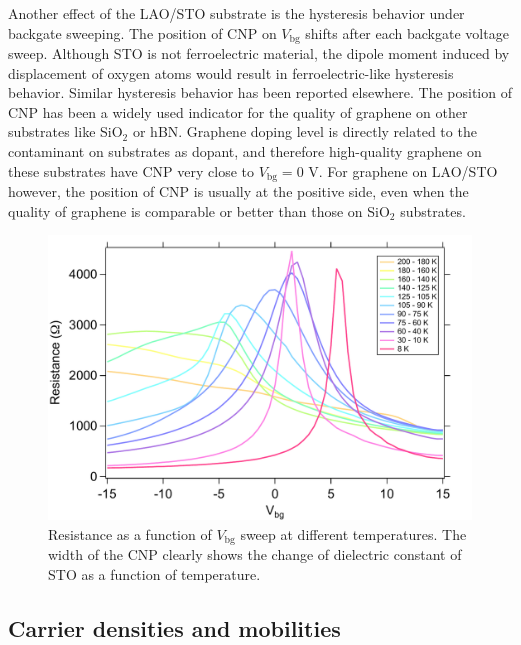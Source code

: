 \documentclass[pdflatex, sectionletters, 12pt]{pittetd}    %
\begin{document}
Another effect of the LAO/STO substrate is the hysteresis behavior under backgate sweeping. The position of CNP on $V_\mathrm{bg}$ shifts after each backgate voltage sweep. Although STO is not ferroelectric material, the dipole moment induced by displacement of oxygen atoms would result in ferroelectric-like hysteresis behavior\cite{sachs2014ferroelectric}. Similar hysteresis behavior has been reported elsewhere\cite{jnawali2017room}. The position of CNP has been a widely used indicator for the quality of graphene on other substrates like SiO$_2$ or hBN. Graphene doping level is directly related to the contaminant on substrates as dopant, and therefore high-quality graphene on these substrates have CNP very close to $V_\mathrm{bg} = 0$ V. For graphene on LAO/STO however, the position of CNP is usually at the positive side, even when the quality of graphene is comparable or better than those on SiO$_2$ substrates. 
\\

\begin{figure}[h!]
	\centering
	\includegraphics[width=.8\textwidth]{Drawing/ResistanceTemp.pdf}
	\caption{Resistance as a function of $V_\mathrm{bg}$ sweep at different temperatures. The width of the CNP clearly shows the change of dielectric constant of STO as a function of temperature.}
	\label{FIG:ResistanceTemp}
\end{figure}

\subsection{Carrier densities and mobilities}
\end{document}
